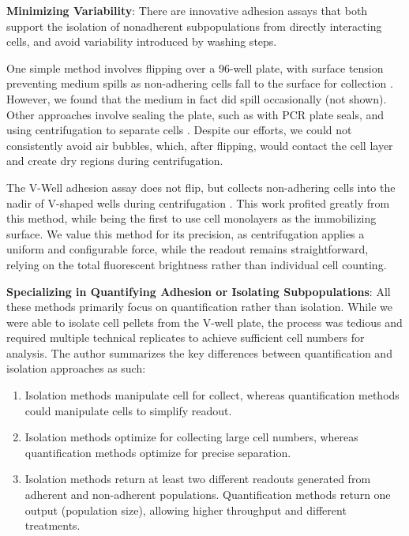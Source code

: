 \textbf{Minimizing Variability}:
There are innovative adhesion assays that both
support the isolation of nonadherent subpopulations from directly interacting
cells, and avoid variability introduced by washing steps.

One simple method involves flipping over a 96-well plate, with surface tension
preventing medium spills as non-adhering cells fall to the surface for
collection \cite{zepeda-morenoInnovativeMethodQuantification2011}. However, we
found that the medium in fact did spill occasionally (not shown). Other
approaches involve sealing the plate, such as with PCR plate seals, and using
centrifugation to separate cells \cite{reyesCentrifugationCellAdhesion2003,
    chenHighThroughputScreeningTest2021}. Despite our efforts, we could not
consistently avoid air bubbles, which, after flipping, would contact the cell
layer and create dry regions during centrifugation.

The V-Well adhesion assay does not flip, but collects non-adhering cells into
the nadir of V-shaped wells during centrifugation
\cite{weetallHomogeneousFluorometricAssay2001}. This work profited greatly from
this method, while  being the first to use cell
monolayers as the immobilizing surface. We value this method for its precision,
as centrifugation applies a uniform and configurable force, while the readout
remains straightforward, relying on the total fluorescent brightness rather than
individual cell counting.




\textbf{Specializing in Quantifying Adhesion or Isolating Subpopulations}: All
these methods primarily focus on quantification rather than isolation. While we
were able to isolate cell pellets from the V-well plate, the process was tedious
and required multiple technical replicates to achieve sufficient cell numbers
for analysis. The author summarizes the key differences between quantification
and isolation approaches as such:
\begin{enumerate}
    \item Isolation methods manipulate cell  for collect, whereas
          quantification methods could manipulate cells to simplify readout.
    \item Isolation methods optimize for collecting large cell numbers, whereas
          quantification methods optimize for precise separation.
    \item Isolation methods return at least two different readouts generated
          from adherent and non-adherent populations. Quantification methods
          return one output (population size), allowing higher throughput and different
          treatments.
\end{enumerate}

